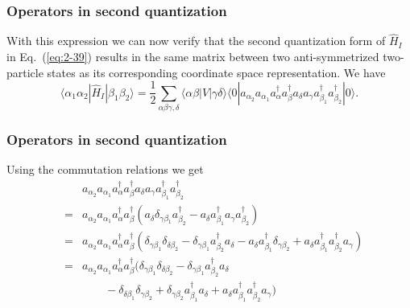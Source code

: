 \documentclass[compress]{beamer}
\newcommand*{\ket}[1]{|#1\rangle}
\newcommand*{\bra}[1]{\langle#1|}
\newcommand{\element}[3]
        {\bra{#1}#2\ket{#3}}
\begin{document}
\frame
{
  \frametitle{Operators in second quantization}
\begin{small}
{\scriptsize
With this expression we can now verify that the second quantization form of $\hat{H}_I$ in Eq.~(\ref{eq:2-39}) 
results in the same matrix between two anti-symmetrized two-particle states as its corresponding coordinate
space representation. We have  
\begin{equation}
	\element{\alpha_1 \alpha_2}{\hat{H}_I}{\beta_1 \beta_2} =
		\frac{1}{2} \sum_{\alpha\beta\gamma, \delta}
			\element{\alpha\beta}{V}{\gamma\delta} \element{0}{a_{\alpha_2} a_{\alpha_1} 
			 a^\dagger_\alpha a^\dagger_\beta a_\delta a_\gamma 
			 a_{\beta_1}^\dagger a_{\beta_2}^\dagger}{0}. \label{eq:2-40}
\end{equation}
}
\end{small}
}


\frame
{
  \frametitle{Operators in second quantization}
\begin{small}
{\scriptsize
Using the commutation relations we get 
\begin{eqnarray}
	&& a_{\alpha_2} a_{\alpha_1}a^\dagger_\alpha a^\dagger_\beta 
		a_\delta a_\gamma a_{\beta_1}^\dagger a_{\beta_2}^\dagger \nonumber \\
	&=& a_{\alpha_2} a_{\alpha_1}a^\dagger_\alpha a^\dagger_\beta 
		( a_\delta \delta_{\gamma \beta_1} a_{\beta_2}^\dagger - 
		a_\delta  a_{\beta_1}^\dagger a_\gamma a_{\beta_2}^\dagger ) \nonumber \\
	&=& a_{\alpha_2} a_{\alpha_1}a^\dagger_\alpha a^\dagger_\beta 
		(\delta_{\gamma \beta_1} \delta_{\delta \beta_2} - \delta_{\gamma \beta_1} a_{\beta_2}^\dagger a_\delta -
		a_\delta a_{\beta_1}^\dagger\delta_{\gamma \beta_2} +
		a_\delta a_{\beta_1}^\dagger a_{\beta_2}^\dagger a_\gamma ) \nonumber \\
	&=& a_{\alpha_2} a_{\alpha_1}a^\dagger_\alpha a^\dagger_\beta 
		(\delta_{\gamma \beta_1} \delta_{\delta \beta_2} - \delta_{\gamma \beta_1} a_{\beta_2}^\dagger a_\delta \nonumber \\
		&& \qquad - \delta_{\delta \beta_1} \delta_{\gamma \beta_2} + \delta_{\gamma \beta_2} a_{\beta_1}^\dagger a_\delta
		+ a_\delta a_{\beta_1}^\dagger a_{\beta_2}^\dagger a_\gamma ) \label{eq:2-41}
\end{eqnarray}
}
\end{small}
}
\end{document}

